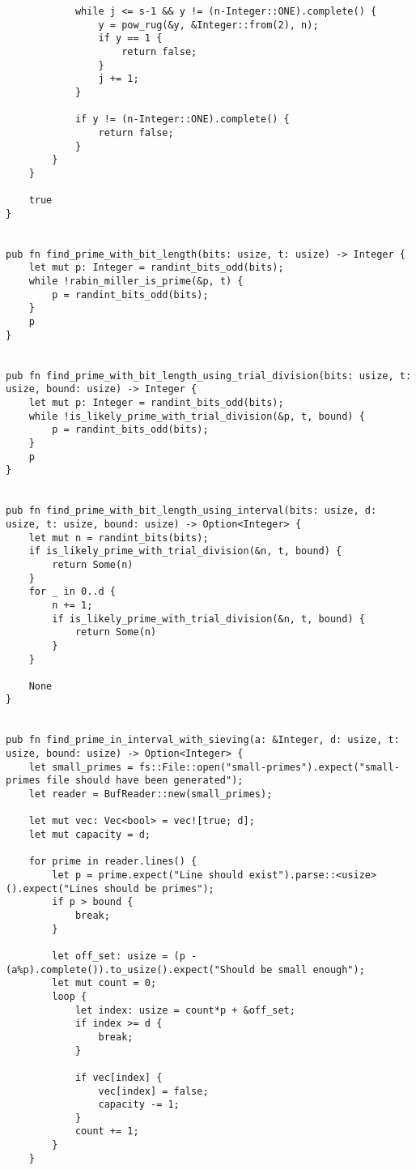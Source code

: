 \begin{verbatim}
            while j <= s-1 && y != (n-Integer::ONE).complete() {
                y = pow_rug(&y, &Integer::from(2), n);
                if y == 1 {
                    return false;
                }
                j += 1;
            }

            if y != (n-Integer::ONE).complete() {
                return false;
            }
        }
    }

    true
}


pub fn find_prime_with_bit_length(bits: usize, t: usize) -> Integer {
    let mut p: Integer = randint_bits_odd(bits);
    while !rabin_miller_is_prime(&p, t) {
        p = randint_bits_odd(bits);
    }
    p
}


pub fn find_prime_with_bit_length_using_trial_division(bits: usize, t: usize, bound: usize) -> Integer {
    let mut p: Integer = randint_bits_odd(bits);
    while !is_likely_prime_with_trial_division(&p, t, bound) {
        p = randint_bits_odd(bits);
    }
    p
}


pub fn find_prime_with_bit_length_using_interval(bits: usize, d: usize, t: usize, bound: usize) -> Option<Integer> {
    let mut n = randint_bits(bits);
    if is_likely_prime_with_trial_division(&n, t, bound) {
        return Some(n)
    }
    for _ in 0..d {
        n += 1;
        if is_likely_prime_with_trial_division(&n, t, bound) {
            return Some(n)
        }
    }

    None
}


pub fn find_prime_in_interval_with_sieving(a: &Integer, d: usize, t: usize, bound: usize) -> Option<Integer> {
    let small_primes = fs::File::open("small-primes").expect("small-primes file should have been generated");
    let reader = BufReader::new(small_primes);

    let mut vec: Vec<bool> = vec![true; d];
    let mut capacity = d;

    for prime in reader.lines() {
        let p = prime.expect("Line should exist").parse::<usize>().expect("Lines should be primes");
        if p > bound {
            break;
        }

        let off_set: usize = (p - (a%p).complete()).to_usize().expect("Should be small enough");
        let mut count = 0;
        loop {
            let index: usize = count*p + &off_set;
            if index >= d {
                break;
            }

            if vec[index] {
                vec[index] = false;
                capacity -= 1;
            }
            count += 1;
        }
    }


\end{verbatim}
